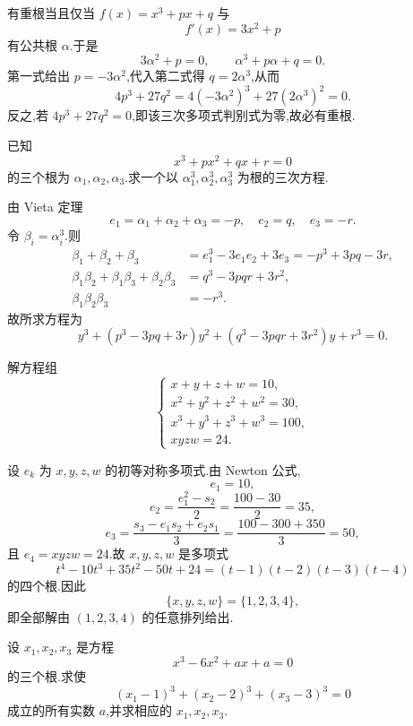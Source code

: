 \begin{solution}
有重根当且仅当 $f(x)=x^3+px+q$ 与
\[
  f'(x)=3x^2+p
\]
有公共根 $\alpha$.于是
\[
  3\alpha^2+p=0,
  \qquad
  \alpha^3+p\alpha+q=0.
\]
第一式给出 $p=-3\alpha^2$,代入第二式得 $q=2\alpha^3$,从而
\[
  4p^3+27q^2
  =4(-3\alpha^2)^3+27(2\alpha^3)^2=0.
\]
反之,若 $4p^3+27q^2=0$,即该三次多项式判别式为零,故必有重根.
\end{solution}

\begin{example}
已知
\[
  x^3+px^2+qx+r=0
\]
的三个根为 $\alpha_1,\alpha_2,\alpha_3$.求一个以
$\alpha_1^3,\alpha_2^3,\alpha_3^3$ 为根的三次方程.
\end{example}
\exampleblank

\begin{solution}
由 Vieta 定理
\[
  e_1=\alpha_1+\alpha_2+\alpha_3=-p,
  \quad
  e_2=q,
  \quad
  e_3=-r.
\]
令 $\beta_i=\alpha_i^3$.则
\[
\begin{aligned}
  \beta_1+\beta_2+\beta_3
  &=e_1^3-3e_1e_2+3e_3
   =-p^3+3pq-3r,\\
  \beta_1\beta_2+\beta_1\beta_3+\beta_2\beta_3
  &=q^3-3pqr+3r^2,\\
  \beta_1\beta_2\beta_3&=-r^3.
\end{aligned}
\]
故所求方程为
\[
\boxed{
  y^3+(p^3-3pq+3r)y^2
  +(q^3-3pqr+3r^2)y+r^3=0 }.
\]
\end{solution}

\begin{example}
解方程组
\[
\begin{cases}
  x+y+z+w=10,\\
  x^2+y^2+z^2+w^2=30,\\
  x^3+y^3+z^3+w^3=100,\\
  xyzw=24.
\end{cases}
\]
\end{example}
\exampleblank

\begin{solution}
设 $e_k$ 为 $x,y,z,w$ 的初等对称多项式.由 Newton 公式,
\[
  e_1=10,
\]
\[
  e_2=\dfrac{e_1^2-s_2}{2}
  =\dfrac{100-30}{2}=35,
\]
\[
  e_3=\dfrac{s_3-e_1s_2+e_2s_1}{3}
  =\dfrac{100-300+350}{3}=50,
\]
且 $e_4=xyzw=24$.故 $x,y,z,w$ 是多项式
\[
  t^4-10t^3+35t^2-50t+24
  =(t-1)(t-2)(t-3)(t-4)
\]
的四个根.因此
\[
  \{x,y,z,w\}=\{1,2,3,4\},
\]
即全部解由 $(1,2,3,4)$ 的任意排列给出.
\end{solution}

\begin{example}
设 $x_1,x_2,x_3$ 是方程
\[
  x^3-6x^2+ax+a=0
\]
的三个根.求使
\[
  (x_1-1)^3+(x_2-2)^3+(x_3-3)^3=0
\]
成立的所有实数 $a$,并求相应的 $x_1,x_2,x_3$.
\end{example}
\exampleblank

